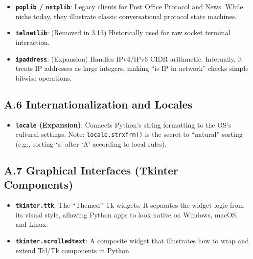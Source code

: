 \begin{itemize}
\tightlist
\item
  \textbf{\passthrough{\lstinline!poplib!} /
  \passthrough{\lstinline!nntplib!}}: Legacy clients for Post Office
  Protocol and News. While niche today, they illustrate classic
  conversational protocol state machines.
\item
  \textbf{\passthrough{\lstinline!telnetlib!}}: (Removed in 3.13)
  Historically used for raw socket terminal interaction.
\item
  \textbf{\passthrough{\lstinline!ipaddress!}}: (Expansion) Handles
  IPv4/IPv6 CIDR arithmetic. Internally, it treats IP addresses as large
  integers, making ``is IP in network'' checks simple bitwise
  operations.
\end{itemize}

\hypertarget{a.6-internationalization-and-locales}{%
\subsection{A.6 Internationalization and
Locales}\label{a.6-internationalization-and-locales}}

\begin{itemize}
\tightlist
\item
  \textbf{\passthrough{\lstinline!locale!} (Expansion)}: Connects
  Python's string formatting to the OS's cultural settings. Note:
  \passthrough{\lstinline!locale.strxfrm()!} is the secret to
  ``natural'' sorting (e.g., sorting `a' after `A' according to local
  rules).
\end{itemize}

\hypertarget{a.7-graphical-interfaces-tkinter-components}{%
\subsection{A.7 Graphical Interfaces (Tkinter
Components)}\label{a.7-graphical-interfaces-tkinter-components}}

\begin{itemize}
\tightlist
\item
  \textbf{\passthrough{\lstinline!tkinter.ttk!}}: The ``Themed'' Tk
  widgets. It separates the widget logic from its visual style, allowing
  Python apps to look native on Windows, macOS, and Linux.
\item
  \textbf{\passthrough{\lstinline!tkinter.scrolledtext!}}: A composite
  widget that illustrates how to wrap and extend Tcl/Tk components in
  Python.
\end{itemize}

